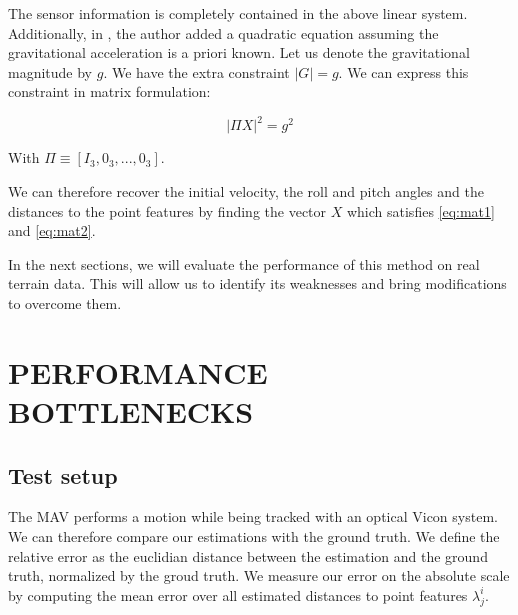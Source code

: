 \documentclass[letterpaper, 10 pt, conference]{ieeeconf}  %
\begin{document}
The sensor information is completely contained in the above linear system. Additionally, in \cite{Martinelli2014}, the author added a quadratic equation assuming the gravitational acceleration is a priori known.
Let us denote the gravitational magnitude by $g$.
We have the extra constraint $|G| = g$. We can express this constraint in matrix formulation:

\begin{equation}
\label{eq:mat2} \tag{10}
| \Pi X | ^2 = g^2
\end{equation}

With $\Pi \equiv [I_3, 0_3, ..., 0_3]$.

We can therefore recover the initial velocity, the roll and pitch angles and the distances to the point features
by finding the vector $X$ which satisfies \ref{eq:mat1} and \ref{eq:mat2}.

In the next sections, we will evaluate the performance of this method on real terrain data.
This will allow us to identify its weaknesses and bring modifications to overcome them.





\section{PERFORMANCE BOTTLENECKS}

\subsection{Test setup}

The MAV performs a motion while being tracked with an optical Vicon system.
We can therefore compare our estimations with the ground truth.
We define the relative error as the euclidian distance between the estimation and the ground truth,
normalized by the groud truth.
We measure our error on the absolute scale by computing the mean error over all estimated distances to point features $\lambda_j^i$.
\end{document}
